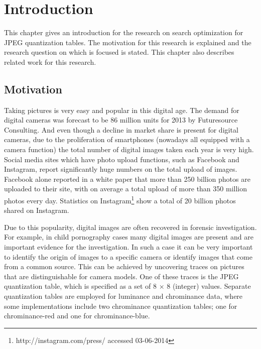 
\chapter{Introduction} %

\label{ch:name} %

This chapter gives an introduction for the research on search optimization for JPEG quantization tables. The motivation for this research is explained and the research question on which is focused is stated. This chapter also describes related work for this research.

\section{Motivation}

Taking pictures is very easy and popular in this digital age. The demand for digital cameras was forecast to be 86 million units for 2013 by Futuresource Consulting\cite{futuresource}. And even though a decline in market share is present for digital cameras, due to the  proliferation of smartphones (nowadays all equipped with a camera function) the total number of digital images taken each year is very high. Social media sites which have photo upload functions, such as Facebook and Instagram, report significantly huge numbers on the total upload of images. Facebook alone reported in a white paper \cite{whitefacebook} that more than 250 billion photos are uploaded to their site, with on average a total upload of more than 350 million photos every day. Statistics on Instagram\footnote{http://instagram.com/press/ accessed 03-06-2014} show a total of 20 billion photos shared on Instagram.

Due to this popularity, digital images are often recovered in forensic investigation. For example, in child pornography cases many digital images are present and are important evidence for the investigation. In such a case it can be very important to identify the origin of images to a specific camera or identify images that come from a common source. This can be achieved by uncovering traces on pictures that are distinguishable for camera models. One of these traces is the JPEG quantization table, which is specified as a set of 8 $\times$ 8 (integer) values. Separate quantization tables are employed for luminance and chrominance data, where some implementations include two chrominance quantization tables; one for chrominance-red and one for chrominance-blue. 

